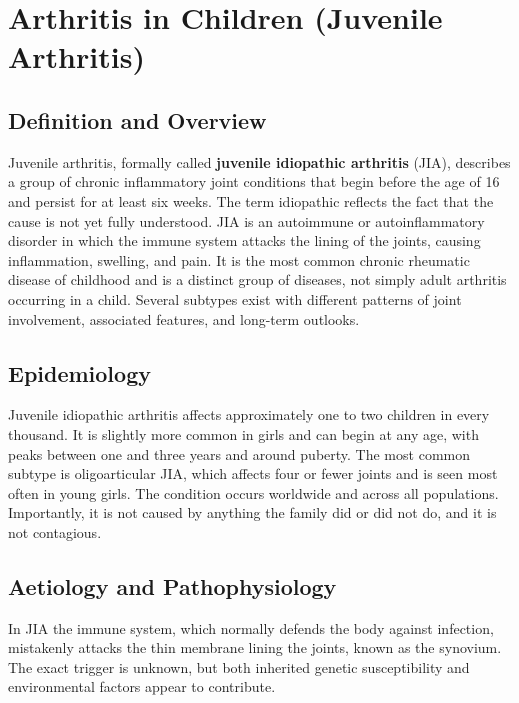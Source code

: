 \chapter{Arthritis in Children (Juvenile Arthritis)}

\section*{Definition and Overview}
Juvenile arthritis, formally called \textbf{juvenile idiopathic arthritis} (JIA), describes a group of chronic inflammatory joint conditions that begin before the age of 16 and persist for at least six weeks. The term idiopathic reflects the fact that the cause is not yet fully understood. JIA is an autoimmune or autoinflammatory disorder in which the immune system attacks the lining of the joints, causing inflammation, swelling, and pain. It is the most common chronic rheumatic disease of childhood and is a distinct group of diseases, not simply adult arthritis occurring in a child. Several subtypes exist with different patterns of joint involvement, associated features, and long-term outlooks.

\section*{Epidemiology}
Juvenile idiopathic arthritis affects approximately one to two children in every thousand. It is slightly more common in girls and can begin at any age, with peaks between one and three years and around puberty. The most common subtype is oligoarticular JIA, which affects four or fewer joints and is seen most often in young girls. The condition occurs worldwide and across all populations. Importantly, it is not caused by anything the family did or did not do, and it is not contagious.

\section*{Aetiology and Pathophysiology}
In JIA the immune system, which normally defends the body against infection, mistakenly attacks the thin membrane lining the joints, known as the synovium. The exact trigger is unknown, but both inherited genetic susceptibility and environmental factors appear to contribute.

